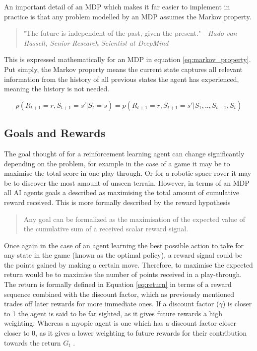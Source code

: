 \documentclass[ %
                    author={Callum Pearce},
                supervisor={Dr. Neill Campbell},
                    degree={MEng},
                     title={How effective are Temporal difference learning methods for reducing the number of zero contribution light paths while still accurately approximating Global Illumination in Path tracing?},
                  subtitle={},
                      type={research},
                      year={2019} ]{dissertation}
\begin{document}
\noindent
An important detail of an MDP which makes it far easier to implement in practice is that any problem modelled by an MDP assumes the Markov property.

\begin{quote}
"The future is independent of the past, given the present." - \textit{Hado van Hasselt, Senior Research Scientist at DeepMind} \cite{introToRL}
\end{quote}

This is expressed mathematically for an MDP in equation \ref{eq:markov_property}. Put simply, the Markov property means the current state captures all relevant information from the history of all previous states the agent has experienced, meaning the history is not needed.

\begin{equation}
\label{eq:markov_property}
p(R_{t+1} = r, S_{t+1} = s' | S_t = s) = p(R_{t+1} = r, S_{t+1} = s' | S_1, .. , S_{t-1}, S_{t})
\end{equation}

\subsection{Goals and Rewards}
The goal thought of for a reinforcement learning agent can change significantly depending on the problem, for example in the case of a game it may be to maximise the total score in one play-through. Or for a robotic space rover it may be to discover the most amount of unseen terrain. However, in terms of an MDP all AI agents goals a described as maximising the total amount of cumulative reward received. This is more formally described by the reward hypothesis \cite{sutton2011reinforcement}

\begin{quote}
Any goal can be formalized as the maximisation of the expected value of the cumulative sum of a received scalar reward signal.
\end{quote}

Once again in the case of an agent learning the best possible action to take for any state in the game (known as the optimal policy), a reward signal could be the points gained by making a certain move. Therefore, to maximise the expected return would be to maximise the number of points received in a play-through.  The return is formally defined in Equation \ref{eq:return} in terms of a reward sequence combined with the discount factor, which as previously mentioned trades off later rewards for more immediate ones. If a discount factor ($\gamma$) is closer to 1 the agent is said to be far sighted, as it gives future rewards a high weighting. Whereas a myopic agent is one which has a discount factor closer closer to 0, as it gives a lower weighting to future rewards for their contribution towards the return $G_t$ \cite{introToRL}. 
\end{document}
